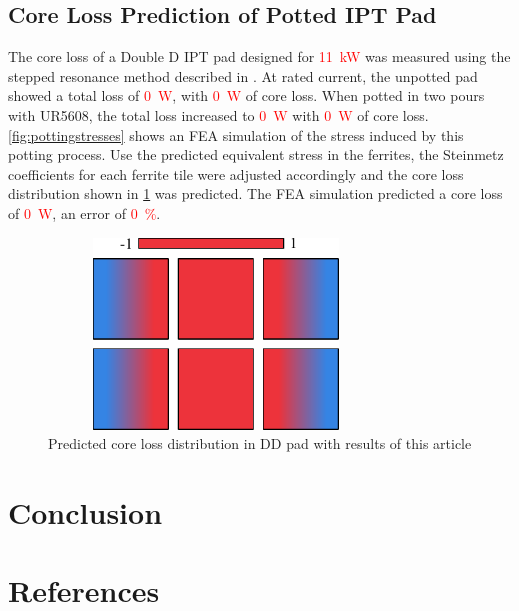 \documentclass[conference]{IEEEtran}
\begin{document}
\subsection{Core Loss Prediction of Potted IPT Pad}
The core loss of a Double D IPT pad designed for \textcolor{red}{\SI{11}{\kilo\watt}} was measured using the stepped resonance method described in \cite{kalraPowerLossMeasurement2020}.
At rated current, the unpotted pad showed a total loss of \textcolor{red}{\SI{0}{\watt}}, with \textcolor{red}{\SI{0}{\watt}} of core loss.
When potted in two pours with UR5608, the total loss increased to \textcolor{red}{\SI{0}{\watt}} with \textcolor{red}{\SI{0}{\watt}} of core loss. 
\cref{fig:pottingstresses} shows an FEA simulation of the stress induced by this potting process. 
Use the predicted equivalent stress in the ferrites, the Steinmetz coefficients for each ferrite tile were adjusted accordingly and the core loss distribution shown in \cref{fig:padcoreloss} was predicted. 
The FEA simulation predicted a core loss of \textcolor{red}{\SI{0}{\watt}}, an error of \textcolor{red}{\SI{0}{\percent}}. 
\begin{figure}[t]
  \includegraphics[width=3.5in, height=2in]{figures/simulatedpottingpadstresses.pdf}
  \caption{Predicted core loss distribution in DD pad with results of this article}
  \label{fig:padcoreloss}
\end{figure}

\section{Conclusion}

\section*{References}
\printbibliography[heading=none]
\end{document}
